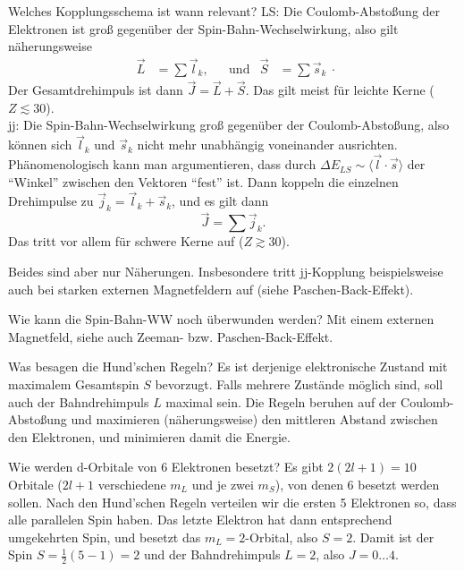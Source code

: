 \begin{fquestion}{Welches Kopplungsschema ist wann relevant?}
    LS: Die Coulomb-Abstoßung der Elektronen ist groß gegenüber der Spin-Bahn-Wechselwirkung, also gilt näherungsweise $$\begin{aligned}\Vec{L} &= \sum \Vec{l}_k, && \mathrm{und} & \Vec{S} &= \sum \Vec{s}_k\end{aligned}.$$
    Der Gesamtdrehimpuls ist dann $\Vec{J} = \Vec{L} + \Vec{S}$.
    Das gilt meist für leichte Kerne ($Z\lesssim 30$).
    \\
    jj: Die Spin-Bahn-Wechselwirkung groß gegenüber der Coulomb-Abstoßung, also können sich $\Vec{l}_k$ und $\Vec{s}_k$ nicht mehr unabhängig voneinander ausrichten.
    Phänomenologisch kann man argumentieren, dass durch $\Delta E_{LS} \sim \langle \Vec{l}\cdot\Vec{s} \rangle$ der ``Winkel'' zwischen den Vektoren ``fest'' ist.
    Dann koppeln die einzelnen Drehimpulse zu $\Vec{j}_k = \Vec{l}_k + \Vec{s}_k$, und es gilt dann
    $$\Vec{J} = \sum \Vec{j}_k.$$
    Das tritt vor allem für schwere Kerne auf ($Z\gtrsim 30$).
    
    Beides sind aber nur Näherungen. 
    Insbesondere tritt jj-Kopplung beispielsweise auch bei starken externen Magnetfeldern auf (siehe Paschen-Back-Effekt).
\end{fquestion}

\begin{fquestion}{Wie kann die Spin-Bahn-WW noch überwunden werden?}
    Mit einem externen Magnetfeld, siehe auch Zeeman- bzw. Paschen-Back-Effekt.
\end{fquestion}

\begin{fquestion}{Was besagen die Hund'schen Regeln?}
    Es ist derjenige elektronische Zustand mit maximalem Gesamtspin $S$ bevorzugt.
    Falls mehrere Zustände möglich sind, soll auch der Bahndrehimpuls $L$ maximal sein.
    Die Regeln beruhen auf der Coulomb-Abstoßung und maximieren (näherungsweise) den mittleren Abstand zwischen den Elektronen, und minimieren damit die Energie.
\end{fquestion}

\begin{fquestion}{Wie werden d-Orbitale von 6 Elektronen besetzt?}
    Es gibt $2(2l + 1) = 10$ Orbitale ($2l+1$ verschiedene $m_L$ und je zwei $m_S$), von denen 6 besetzt werden sollen.
    Nach den Hund'schen Regeln verteilen wir die ersten 5 Elektronen so, dass alle parallelen Spin haben. 
    Das letzte Elektron hat dann entsprechend umgekehrten Spin, und besetzt das $m_L=2$-Orbital, also $S=2$.
    Damit ist der Spin $S= \frac{1}{2}(5 - 1) = 2$ und der Bahndrehimpuls $L=2$, also $J = 0\dots 4$.
\end{fquestion}

